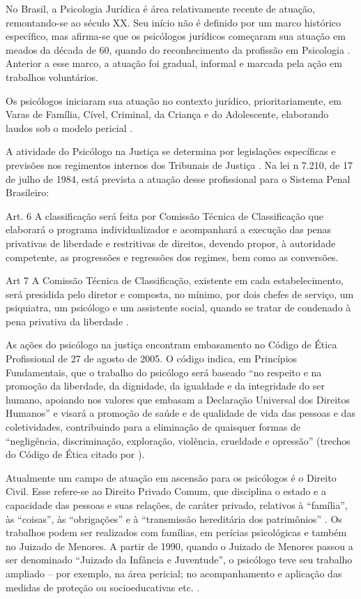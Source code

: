No Brasil, a Psicologia Jurídica é área relativamente recente de atuação,  remontando-se ao século XX. Seu início não é definido por um marco histórico específico, mas afirma-se que os psicólogos jurídicos começaram sua atuação em meados da década de 60, quando do reconhecimento da profissão em Psicologia \cite{LAGO2009}. Anterior a esse marco, a atuação foi gradual, informal e marcada pela ação em trabalhos voluntários.

Os psicólogos iniciaram sua atuação no contexto jurídico, prioritariamente, em Varas de Família, Cível, Criminal, da Criança e do Adolescente, elaborando laudos sob o modelo pericial \cite{COSTA2009}.

A atividade do Psicólogo na Justiça se determina por legislações específicas e previsões nos regimentos internos dos Tribunais de Justiça \cite{COSTA2009}. Na lei n{\textordmasculine} 7.210, de 17 de julho de 1984, está prevista a atuação desse profissional para o Sistema Penal Brasileiro:

\begin{citacao}
	Art. 6{\textordmasculine} A classificação será feita por Comissão Técnica de Classificação que elaborará o programa individualizador e acompanhará a execução das penas privativas de liberdade e restritivas de direitos, devendo propor, à autoridade competente, as progressões e regressões dos regimes, bem como as conversões.

	Art 7{\textordmasculine} A Comissão Técnica de Classificação, existente em cada estabelecimento, será presidida pelo diretor e composta, no mínimo, por dois chefes de serviço, um psiquiatra, um psicólogo e um assistente social, quando se tratar de condenado à pena privativa da liberdade \cite[n.p.]{BRASIL1984}.
\end{citacao}

As ações do psicólogo na justiça encontram embasamento no Código de Ética Profissional de 27 de agosto de 2005. O código indica, em Princípios Fundamentais, que o trabalho do psicólogo será baseado ``no respeito e na promoção da liberdade, da dignidade, da igualdade e da integridade do ser humano, apoiando nos valores que embasam a Declaração Universal dos Direitos Humanos''  e visará a promoção de saúde e de qualidade de vida das pessoas e das coletividades, contribuindo para a eliminação de quaisquer formas de ``negligência, discriminação, exploração, violência, crueldade e opressão'' (trechos do Código de Ética citado por ). 

Atualmente um campo de atuação em ascensão para os psicólogos é o Direito Civil. Esse refere-se ao Direito Privado Comum, que disciplina o estado e a capacidade das pessoas e suas relações, de caráter privado, relativos à ``família'', às ``coisas'', às ``obrigações'' e à ``transmissão hereditária dos patrimônios'' \cite{BRASIL2002}. Os trabalhos podem ser realizados com famílias, em perícias psicológicas e também no Juizado de Menores. A partir de 1990, quando o Juizado de Menores passou a ser denominado ``Juizado da Infância e Juventude'', o psicólogo teve seu trabalho ampliado -- por exemplo, na área pericial; no acompanhamento e aplicação das medidas de proteção ou socioeducativas etc. . 

